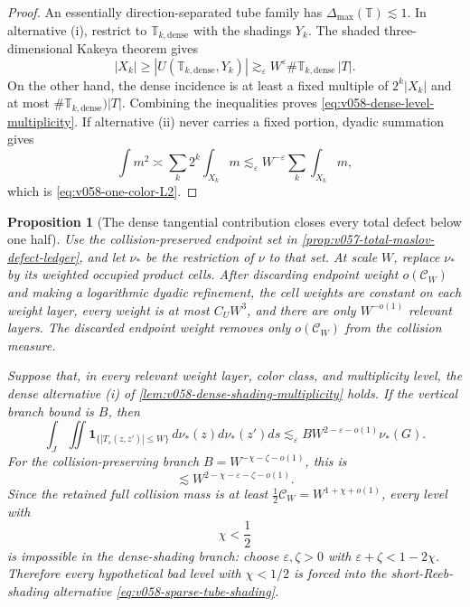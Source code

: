 \documentclass[10pt]{article}
\newtheorem{proposition}[theorem]{Proposition}
\begin{document}
\begin{proof}
An essentially direction-separated tube family has
\(\Delta_{\max}(\mathbb T)\lesssim1\).  In alternative \textnormal{(i)}, restrict to
\(\mathbb T_{k,\mathrm{dense}}\) with the shadings \(Y_k\).  The shaded three-dimensional Kakeya
theorem gives
\[
|X_k|
\ge
|U(\mathbb T_{k,\mathrm{dense}},Y_k)|
\gtrsim_\varepsilon
W^\varepsilon
\#\mathbb T_{k,\mathrm{dense}}\,|T|.
\]
On the other hand, the dense incidence is at least a fixed multiple of
\(2^k|X_k|\) and at most
\(\#\mathbb T_{k,\mathrm{dense}})|T|\).  Combining the inequalities proves
\eqref{eq:v058-dense-level-multiplicity}.  If alternative \textnormal{(ii)} never carries a fixed
portion, dyadic summation gives
\[
\int m^2
\asymp
\sum_k2^k\int_{X_k}m
\lesssim_\varepsilon
W^{-\varepsilon}\sum_k\int_{X_k}m,
\]
which is \eqref{eq:v058-one-color-L2}.
\end{proof}

\begin{proposition}[The dense tangential contribution closes every total defect below one half]
\label{prop:v058-dense-tangential-half-range}
Use the collision-preserved endpoint set in
\cref{prop:v057-total-maslov-defect-ledger}, and let \(\nu_*\) be the restriction of \(\nu\) to
that set.  At scale \(W\), replace \(\nu_*\) by its weighted occupied product cells.  After
discarding endpoint weight \(o(\mathcal C_W)\) and making a logarithmic dyadic refinement, the cell
weights are constant on each weight layer, every weight is at most \(C_UW^3\), and there are only
\(W^{-o(1)}\) relevant layers.  The discarded endpoint weight removes only
\(o(\mathcal C_W)\) from the collision measure.

Suppose that, in every relevant weight layer, color class, and multiplicity level, the dense
alternative \textnormal{(i)} of
\cref{lem:v058-dense-shading-multiplicity} holds.  If the vertical branch bound is \(B\), then
\begin{equation}
\label{eq:v058-dense-tangential-collision-bound}
\boxed{
\int_J\iint
\mathbf 1_{\{|T_s(z,z')|\le W\}}
\,d\nu_*(z)d\nu_*(z')ds
\lesssim_\varepsilon
B W^{2-\varepsilon-o(1)}\nu_*(G).
}
\end{equation}
For the collision-preserving branch
\(B=W^{-\chi-\zeta-o(1)}\), this is
\begin{equation}
\label{eq:v058-dense-total-defect-bound}
\boxed{
\lesssim
W^{2-\chi-\varepsilon-\zeta-o(1)}.
}
\end{equation}
Since the retained full collision mass is at least
\(\frac12\mathcal C_W=W^{1+\chi+o(1)}\), every level with
\begin{equation}
\label{eq:v058-half-range-condition}
\boxed{\chi<\frac12}
\end{equation}
is impossible in the dense-shading branch: choose
\(\varepsilon,\zeta>0\) with
\(\varepsilon+\zeta<1-2\chi\).  Therefore every hypothetical bad level with
\(\chi<1/2\) is forced into the short-Reeb-shading alternative
\eqref{eq:v058-sparse-tube-shading}.
\end{proposition}
\end{document}
